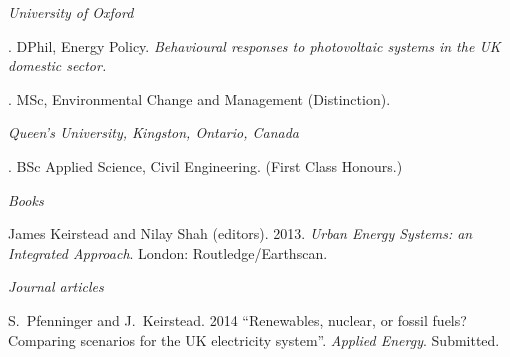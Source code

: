 \documentclass[11pt,a4paper]{article}
\begin{document}

\noindent{}%
%
\emph{University of Oxford \vspace{0.01in}}

.  DPhil, Energy Policy. \emph{Behavioural responses to photovoltaic systems in the UK domestic sector.}

.  MSc, Environmental Change and Management (Distinction).

\medskip

\noindent\emph{Queen's University, Kingston, Ontario, Canada\vspace{0.02in}}

. BSc Applied Science, Civil Engineering. (First Class Honours.) 

\bigskip
 
\noindent{}%
%
\noindent\emph{Books \vspace{0.01in}}

\ind James Keirstead and Nilay Shah (editors).  2013. \emph{Urban Energy Systems: an Integrated Approach}. London: Routledge/Earthscan.

\bigskip

\emph{Journal articles \vspace{0.01in}} %
 
%
%
%
%
%
% 
%
%  
\ind S.\ Pfenninger and J.\ Keirstead. 2014 ``Renewables, nuclear, or fossil fuels? Comparing scenarios for the UK electricity system''.  \emph{Applied Energy}.  Submitted.
\end{document}
